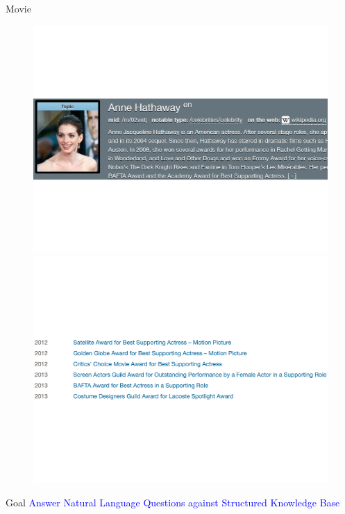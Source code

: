 \documentclass{beamer}
\begin{document}
\begin{frame}{Movie}
	\begin{figure}
		\centering\includegraphics[width=1.0\textwidth]{introduction/annehathway.pdf}\\
		\centering\includegraphics[width=1.0\textwidth]{introduction/awards_won.pdf}\\
	\end{figure}
\end{frame}

\begin{frame}
	\begin{block}{Goal}
	\textcolor{blue}{Answer Natural Language Questions against Structured Knowledge Base}
	\end{block}
\end{frame}
\end{document}
